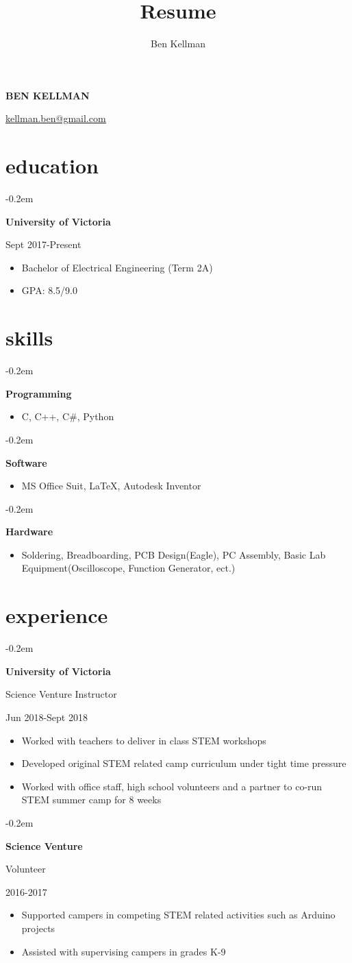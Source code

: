 \documentclass{article}
\author{Ben Kellman}
\title{Resume}
\makeatletter
\renewcommand{\maketitle}{
\begin{center}
    \textbf{\LARGE{\MakeUppercase{Ben Kellman}}}

    \vspace{0.75em}
    \underline{\href{mailto: kellman.ben@gmail.com}{kellman.ben@gmail.com}}

\end{center}
}
\newcommand{\ritem}[1]{
\item\hfill {#1}
}
\newcommand{\fancybullet}[2]{
{ {


\parbox[t]{5.5cm}{
\begin{minipage}[t]{5.5cm}
   \begin{list}{\quad}{}
   \itemsep-0.2em
     #1
   \end{list}
\end{minipage}
}
\parbox[t]{13cm}{
\begin{minipage}[t]{13cm}
   \begin{itemize}
   \itemsep-0.2em
     #2
   \end{itemize}
\end{minipage}
}}\newline}
}
\makeatother
\begin{document}
\maketitle

\section{education}
\fancybullet{
\ritem{\bfseries University of Victoria}
\ritem{Sept 2017-Present}
}{
\item Bachelor of Electrical Engineering (Term 2A)
\item GPA: 8.5/9.0
}

\section{skills}
\fancybullet{
\ritem{\bfseries Programming}
}{
\item C, C++, C\#, Python
}
\fancybullet{
\ritem{\bfseries Software}
}{
\item MS Office Suit, \LaTeX, Autodesk Inventor
}

\fancybullet{
\ritem{\bfseries Hardware}
}{
\item Soldering, Breadboarding, PCB Design(Eagle), PC Assembly, Basic Lab \newline Equipment(Oscilloscope, Function Generator, ect.)
}


\section{experience}
\fancybullet{
\ritem {\bfseries University of Victoria}
\ritem {Science Venture Instructor}
\ritem{Jun 2018-Sept 2018}
}{
\item Worked with teachers to deliver in class STEM workshops
\item Developed original STEM related camp curriculum under tight time pressure
\item Worked with office staff, high school volunteers and a partner to co-run STEM summer camp for 8 weeks
}
\vspace{1em}
\fancybullet{
\ritem{\bfseries Science Venture}
\ritem{Volunteer}
\ritem{2016-2017}
}{
\item Supported campers in competing STEM related activities such as Arduino projects
\item Assisted with supervising campers in grades K-9
}
\end{document}
